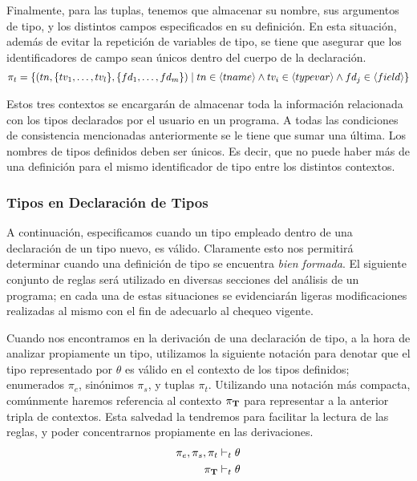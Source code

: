Finalmente, para las tuplas, tenemos que almacenar su nombre, sus argumentos de tipo, y los distintos campos especificados en su definición.
En esta situación, además de evitar la repetición de variables de tipo, se tiene que asegurar que los identificadores de campo sean únicos dentro del cuerpo de la declaración.
\begin{gather*}
\pi_{t} =
\{
(tn, \{ tv_1, \ldots, tv_l \}, \{ fd_1, \ldots, fd_m \} ) \mid
tn \in \langle tname \rangle 
\wedge
tv_i \in \langle typevar \rangle
\wedge
fd_j \in \langle field \rangle
\}
\end{gather*}

Estos tres contextos se encargarán de almacenar toda la información relacionada con los tipos declarados por el usuario en un programa.
A todas las condiciones de consistencia mencionadas anteriormente se le tiene que sumar una última.
Los nombres de tipos definidos deben ser únicos.
Es decir, que no puede haber más de una definición para el mismo identificador de tipo entre los distintos contextos.

\subsubsection{Tipos en Declaración de Tipos}

A continuación, especificamos cuando un tipo empleado dentro de una declaración de un tipo nuevo, es válido.
Claramente esto nos permitirá determinar cuando una definición de tipo se encuentra \textit{bien formada}.
El siguiente conjunto de reglas será utilizado en diversas secciones del análisis de un programa; en cada una de estas situaciones se evidenciarán ligeras modificaciones realizadas al mismo con el fin de adecuarlo al chequeo vigente.

Cuando nos encontramos en la derivación de una declaración de tipo, a la hora de analizar propiamente un tipo, utilizamos la siguiente notación para denotar que el tipo representado por $\theta$ es válido en el contexto de los tipos definidos; enumerados $\pi_{e}$, sinónimos $\pi_{s}$, y tuplas $\pi_{t}$.
Utilizando una notación más compacta, comúnmente haremos referencia al contexto $\pi_{\mathbf{T}}$ para representar a la anterior tripla de contextos.
Esta salvedad la tendremos para facilitar la lectura de las reglas, y poder concentrarnos propiamente en las derivaciones.
\begin{align*}
\pi_{e}, \pi_{s}, \pi_{t} &\vdash_t \theta
\\
\pi_{\mathbf{T}} &\vdash_t \theta
\end{align*}


